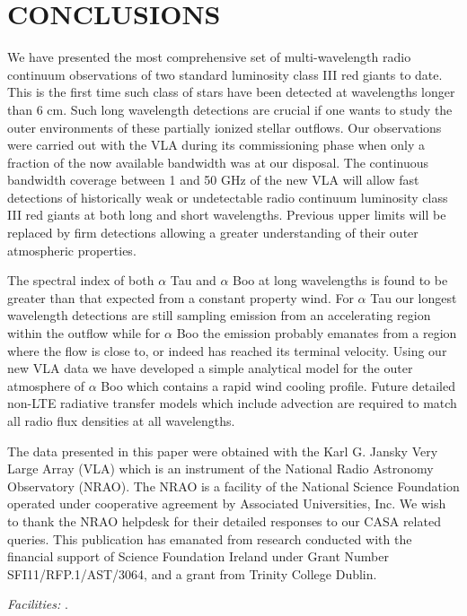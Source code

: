 \documentclass[iop]{emulateapj}
\begin{document}
\section{CONCLUSIONS}
We have presented the most comprehensive set of multi-wavelength radio continuum observations of two standard luminosity class III red giants to date. This is the first time such class of stars have been detected at wavelengths longer than 6 cm. Such long wavelength detections are crucial if one wants to study the outer environments of these partially ionized stellar outflows. Our observations were carried out with the VLA during its commissioning phase when only a fraction of the now available bandwidth was at our disposal. The continuous bandwidth coverage between 1 and 50 GHz of the new VLA will allow fast detections of historically weak or undetectable radio continuum luminosity class III red giants at both long and short wavelengths. Previous upper limits will be replaced by firm detections allowing a greater understanding of their outer atmospheric properties.

The spectral index of both $\alpha$ Tau and $\alpha$ Boo at long wavelengths is found to be greater than that expected from a constant property wind. For $\alpha$ Tau our longest wavelength detections are still sampling emission from an accelerating region within the outflow while for $\alpha$ Boo the emission probably emanates from a region where the flow is close to, or indeed has reached its terminal velocity. Using our new VLA data we have developed a simple analytical model for the outer atmosphere of $\alpha$ Boo which contains a rapid wind cooling profile. Future detailed non-LTE radiative transfer models which include advection are required to match all radio flux densities at all wavelengths. 


\acknowledgments
The data presented in this paper were obtained with the Karl G. Jansky Very Large Array (VLA) which is an instrument of the National Radio Astronomy Observatory (NRAO). The NRAO is a facility of the National Science Foundation operated under cooperative agreement by Associated Universities, Inc. We wish to thank the NRAO helpdesk for their detailed responses to our CASA related queries. This publication has emanated from research conducted with the financial support of Science Foundation Ireland under Grant Number SFI11/RFP.1/AST/3064, and a grant from Trinity College Dublin.

{\it Facilities:} .




\end{document}
